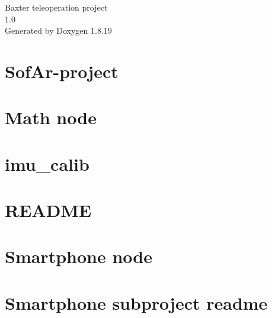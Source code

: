 \let\mypdfximage\pdfximage\def\pdfximage{\immediate\mypdfximage}\documentclass[twoside]{book}
\newcommand{\+}{\discretionary{\mbox{\scriptsize$\hookleftarrow$}}{}{}}
\newcommand{\clearemptydoublepage}{%
  \newpage{\pagestyle{empty}\cleardoublepage}%
}
\begin{document}
\hypersetup{pageanchor=false,
             bookmarksnumbered=true,
             pdfencoding=unicode
            }
\begin{titlepage}
\vspace*{7cm}
\begin{center}%
{\Large Baxter teleoperation project \\[1ex]\large 1.\+0 }\\
\vspace*{1cm}
{\large Generated by Doxygen 1.8.19}\\
\end{center}
\end{titlepage}
\clearemptydoublepage
{}
\tableofcontents
\clearemptydoublepage
{}
\hypersetup{pageanchor=true}

\chapter{Sof\+Ar-\/project}
\label{index}\hypertarget{index}{}
\chapter{Math node}
\label{md_Math_README}

\chapter{imu\+\_\+calib}
\label{md_Smartphone_imu_calib_README}

\chapter{R\+E\+A\+D\+ME}
\label{md_Smartphone_README}

\chapter{Smartphone node}
\label{md_Smartphone_smartphone_readme}

\chapter{Smartphone subproject readme}
\label{md_Smartphone_smartphone_scripts_readme}

\end{document}
